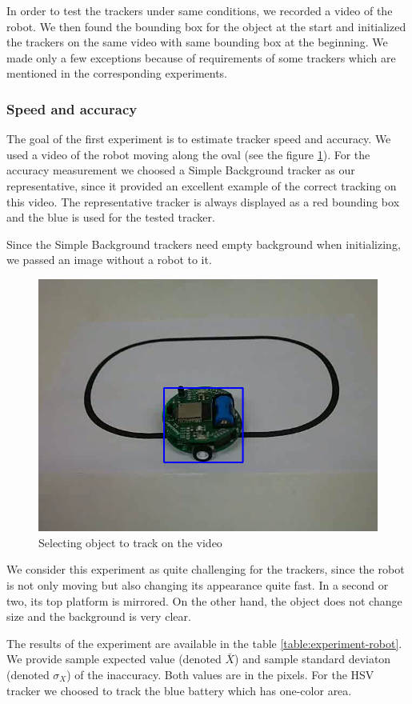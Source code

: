 In order to test the trackers under same conditions, we recorded a video of the
robot. We then found the bounding box for the object at the start and
initialized the trackers on the same video with same bounding box at the
beginning. We made only a few exceptions because of requirements of some
trackers which are mentioned in the corresponding experiments.

\subsubsection{Speed and accuracy}

The goal of the first experiment is to estimate tracker speed and accuracy. We
used a video of the robot moving along the oval (see the figure
\ref{fig:robot-oval}). For the accuracy measurement we choosed a Simple
Background tracker as our representative, since it provided an excellent
example of the correct tracking on this video. The representative tracker is
always displayed as a red bounding box and the blue is used for the tested
tracker.

Since the Simple Background trackers need empty background when
initializing, we passed an image without a robot to it.

\begin{figure}
\centering
\includegraphics[width=0.6\linewidth]{img/robot-oval.png}
\caption{Selecting object to track on the video}
\label{fig:robot-oval}
\end{figure}

We consider this experiment as quite challenging for the trackers, since the
robot is not only moving but also changing its appearance quite fast. In a
second or two, its top platform is mirrored. On the other hand, the object does
not change size and the background is very clear.

The results of the experiment are available in the table
\ref{table:experiment-robot}. We provide sample expected value (denoted
$\bar{X}$) and sample standard deviaton (denoted $\sigma_X$) of the
inaccuracy. Both values are in the pixels. For the HSV tracker we choosed to
track the blue battery which has one-color area.

